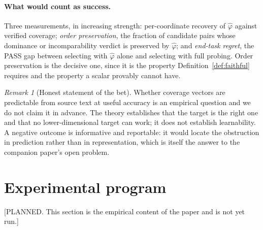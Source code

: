 \documentclass[11pt]{article}
\theoremstyle{plain}
\theoremstyle{definition}
\theoremstyle{remark}
\newtheorem{remark}{Remark}
\begin{document}
\paragraph{What would count as success.}
Three measurements, in increasing strength: per-coordinate recovery of $\widehat{\varphi}$ against
verified coverage; \emph{order preservation}, the fraction of candidate pairs whose dominance or
incomparability verdict is preserved by $\widehat{\varphi}$; and \emph{end-task regret}, the PASS
gap between selecting with $\widehat{\varphi}$ alone and selecting with full probing. Order
preservation is the decisive one, since it is the property Definition~\ref{def:faithful} requires
and the property a scalar provably cannot have.

\begin{remark}[Honest statement of the bet]
Whether coverage vectors are predictable from source text at useful accuracy is an empirical
question and we do not claim it in advance. The theory establishes that the target is the right one
and that no lower-dimensional target can work; it does not establish learnability. A negative
outcome is informative and reportable: it would locate the obstruction in prediction rather than in
representation, which is itself the answer to the companion paper's open problem.
\end{remark}

\section{Experimental program}
\label{sec:experiments}

[PLANNED. This section is the empirical content of the paper and is not yet run.]
\end{document}
